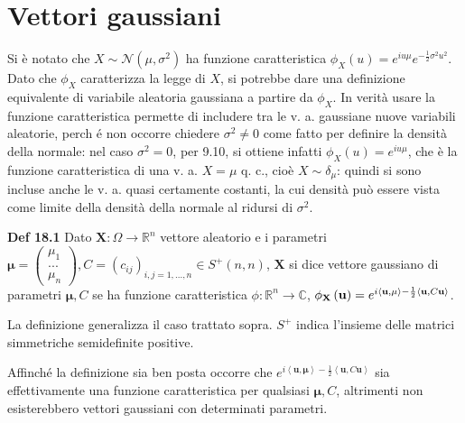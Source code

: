 \documentclass{article}
\begin{document}
\section{Vettori gaussiani}

Si \`{e} notato che $X\sim \mathcal{N}\left( \mu ,\sigma ^{2}\right) $ ha
funzione caratteristica $\phi _{X}\left( u\right) =e^{iu\mu }e^{-\frac{1}{2}%
\sigma ^{2}u^{2}}$. Dato che $\phi _{X}$ caratterizza la legge di $X$, si
potrebbe dare una definizione equivalente di variabile aleatoria gaussiana a
partire da $\phi _{X}$. In verit\`{a} usare la funzione caratteristica
permette di includere tra le v. a. gaussiane nuove variabili aleatorie, perch%
\'{e} non occorre chiedere $\sigma ^{2}\neq 0$ come fatto per definire la
densit\`{a} della normale: nel caso $\sigma ^{2}=0$, per 9.10, si ottiene
infatti $\phi _{X}\left( u\right) =e^{iu\mu }$, che \`{e} la funzione
caratteristica di una v. a. $X=\mu $ q. c., cio\`{e} $X\sim \delta _{\mu }$:
quindi si sono incluse anche le v. a. quasi certamente costanti, la cui
densit\`{a} pu\`{o} essere vista come limite della densit\`{a} della normale
al ridursi di $\sigma ^{2}$.

\textbf{Def 18.1} Dato $\mathbf{X}:\Omega \rightarrow 
\mathbb{R}
^{n}$ vettore aleatorio e i parametri $\mathbf{\mu }=\left( 
\begin{array}{c}
\mu _{1} \\ 
... \\ 
\mu _{n}%
\end{array}%
\right) ,C=\left( c_{ij}\right) _{i,j=1,...,n}\in S^{+}\left( n,n\right) $, $%
\mathbf{X}$ si dice vettore gaussiano di parametri $\mathbf{\mu },C$ se ha
funzione caratteristica $\phi :%
\mathbb{R}
^{n}\rightarrow 
\mathbb{C}
$, $\phi _{\mathbf{X}}\left( \mathbf{u}\right) =e^{i\left\langle \mathbf{%
u,\mu }\right\rangle -\frac{1}{2}\left\langle \mathbf{u},C\mathbf{u}%
\right\rangle }$.

La definizione generalizza il caso trattato sopra. $S^{+}$ indica l'insieme
delle matrici simmetriche semidefinite positive.

Affinch\'{e} la definizione sia ben posta occorre che $e^{i\left\langle 
\mathbf{u,\mu }\right\rangle -\frac{1}{2}\left\langle \mathbf{u},C\mathbf{u}%
\right\rangle }$ sia effettivamente una funzione caratteristica per
qualsiasi $\mathbf{\mu },C$, altrimenti non esisterebbero vettori gaussiani
con determinati parametri.
\end{document}
